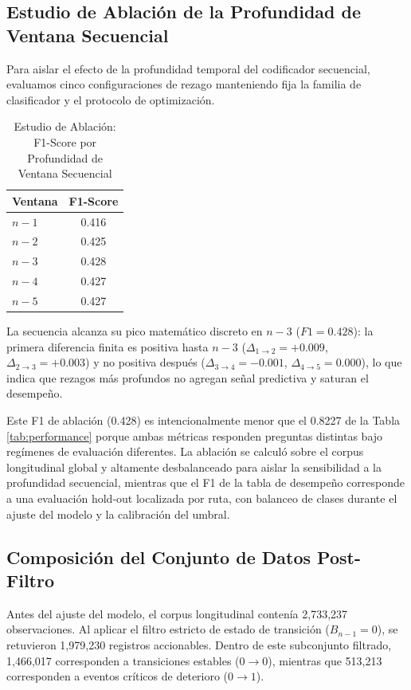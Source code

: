 \documentclass[journal,twocolumn]{IEEEtran}
\def\t{}
\begin{document}
\subsection{Estudio de Ablación de la Profundidad de Ventana Secuencial}
Para aislar el efecto de la profundidad temporal del codificador secuencial, evaluamos cinco configuraciones de rezago manteniendo fija la familia de clasificador y el protocolo de optimización.

\begin{table}[htbp]
	\t\caption{Estudio de Ablación: F1-Score por Profundidad de Ventana Secuencial}
	\t\centering
	\t\begin{tabular}{@{}lc@{}}
		\t\t\toprule
		\t\t\textbf{Ventana} & \textbf{F1-Score} \\ \midrule
		\t\t$n-1$            & 0.416             \\
		\t\t$n-2$            & 0.425             \\
		\t\t$n-3$            & 0.428             \\
		\t\t$n-4$            & 0.427             \\
		\t\t$n-5$            & 0.427             \\ \bottomrule
		\t\end{tabular}
	\t\label{tab:ablation}
\end{table}

La secuencia alcanza su pico matemático discreto en $n-3$ ($F1=0.428$): la primera diferencia finita es positiva hasta $n-3$ ($\Delta_{1\rightarrow2}=+0.009$, $\Delta_{2\rightarrow3}=+0.003$) y no positiva después ($\Delta_{3\rightarrow4}=-0.001$, $\Delta_{4\rightarrow5}=0.000$), lo que indica que rezagos más profundos no agregan señal predictiva y saturan el desempeño.

Este F1 de ablación (0.428) es intencionalmente menor que el 0.8227 de la Tabla \ref{tab:performance} porque ambas métricas responden preguntas distintas bajo regímenes de evaluación diferentes. La ablación se calculó sobre el corpus longitudinal global y altamente desbalanceado para aislar la sensibilidad a la profundidad secuencial, mientras que el F1 de la tabla de desempeño corresponde a una evaluación hold-out localizada por ruta, con balanceo de clases durante el ajuste del modelo y la calibración del umbral.

\subsection{Composición del Conjunto de Datos Post-Filtro}
Antes del ajuste del modelo, el corpus longitudinal contenía 2,733,237 observaciones. Al aplicar el filtro estricto de estado de transición ($B_{n-1}=0$), se retuvieron 1,979,230 registros accionables. Dentro de este subconjunto filtrado, 1,466,017 corresponden a transiciones estables ($0 \rightarrow 0$), mientras que 513,213 corresponden a eventos críticos de deterioro ($0 \rightarrow 1$).
\end{document}
